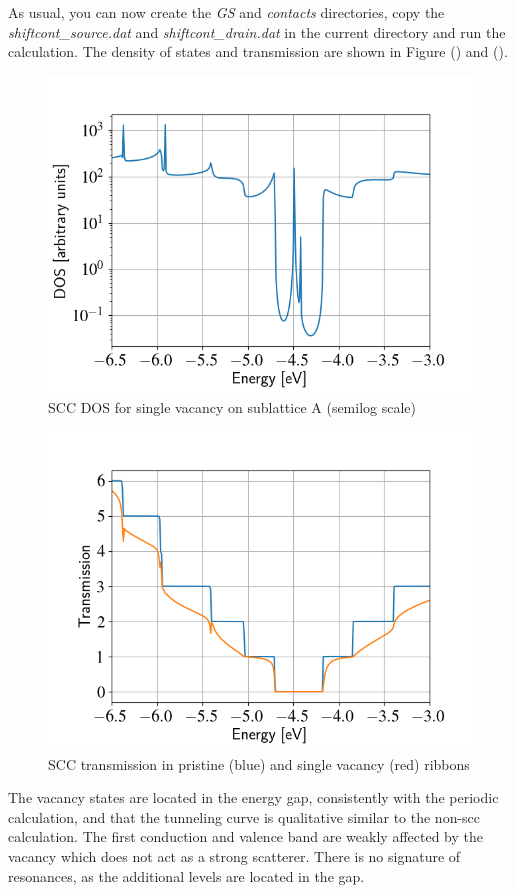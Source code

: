 \documentclass[a4paper,11pt,english]{sphinxmanual}
\begin{document}
{{As usual, you can now create the \emph{GS} and \emph{contacts} directories, copy
the \emph{shiftcont\_source.dat} and \emph{shiftcont\_drain.dat} in the current
directory and run the calculation.  The density of states and
transmission are shown in Figure {\hyperref[transport:fig-scc-vac-dos]{\emph{}}} () and
{\hyperref[transport:fig-scc-vac-tunn]{\emph{}}} ().
\begin{figure}[htbp]
\centering
\capstart
\includegraphics[width=0.700\linewidth]{scc-vac-dos.png}
\caption{SCC DOS for single vacancy on sublattice A (semilog scale)}\label{transport:fig-scc-vac-dos}\end{figure}
\begin{figure}[htbp]
\centering
\capstart
\includegraphics[width=0.700\linewidth]{scc-vac-tunn.png}
\caption{SCC transmission in pristine (blue) and single vacancy (red) ribbons}\label{transport:fig-scc-vac-tunn}\end{figure}

The vacancy states are located in the energy gap, consistently with
the periodic calculation, and that the tunneling curve is qualitative
similar to the non-scc calculation. The first conduction and valence
band are weakly affected by the vacancy which does not act as a strong
scatterer. There is no signature of resonances, as the additional
levels are located in the gap.

}}
\end{document}
